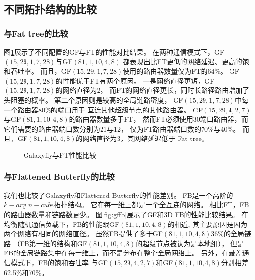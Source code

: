 \subsection{不同拓扑结构的比较}


\subsubsection{与Fat tree的比较}
图\ref{fig:gfft}展示了不同配置的GF与FT的性能对比结果。
在两种通信模式下，GF$(15,29,1,7,28)$与GF$(81,1,10,4,8)$
都表现出比FT更低的网络延迟、更高的饱和吞吐率。
而且，GF$(15,29,1,7,28)$使用的路由器数量仅为FT的64\%。
GF$(15,29,1,7,28)$的性能优于FT有两个原因。
一是网络直径更短，GF$(15,29,1,7,28)$的网络直径为2。
而FT的网络直径更长，同时长路径路由增加了头阻塞的概率。
第二个原因则是较高的全局链路密度，
GF$(15,29,1,7,28)$中每一个路由器80\%的端口用于
互连其他超级节点的其他路由器。
GF$(15,29,4,2,7)$与GF$(81,1,10,4,8)$的路由器数量多于FT，
然而FT必须使用30端口路由器，而它们需要的路由器端口数分别为21与12，
仅为FT路由器端口数的70\%与40\%。
而且，GF$(81,1,10,4,8)$的网络直径为3，其网络延迟低于
Fat tree。

\begin{figure}
  \centering
  \begin{minipage}[t]{\textwidth}
    \centering
    \caption{Galaxyfly与FT性能比较}
    \label{fig:gfft}
  \end{minipage}
\end{figure}

\subsubsection{与Flattened Butterfly的比较}
我们也比较了Galaxyfly和Flattened Butterfly的性能差别。
FB是一个高阶的$k-ary$ $n-cube$拓扑结构。
它在每一维上都是一个全互连的网络。
相比FT，FB的路由器数量和链路数更少。
图\ref{fig:gffb}展示了GF和3D FB的性能比较结果。
在均衡随机通信负载下，FB的性能跟GF$(81,1,10,4,8)$的相近,
其主要原因是因为两个网络有相同的网络直径。
虽然FB提供了多于GF$(81,1,10,4,8)$36\%的全局链路
（FB第一维的结构和GF$(81,1,10,4,8)$的超级节点被认为是本地组），
但是FB的全局链路集中在每一维上，而不是分布在整个全局网络上。
另外，在最差通信模式下，FB的饱和吞吐率
与GF$(15,29,4,2,7)$和GF$(81,1,10,4,8)$分别相差62.5\%和70\%。

